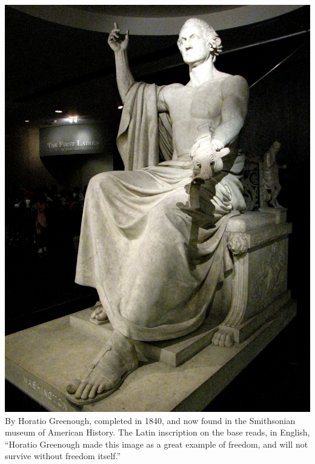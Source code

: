 \begin{frame}
    \centering
    \includegraphics[height=.8\textheight]{img/fasces/washington1.jpg} \\
    By Horatio Greenough, completed in 1840, and now found in the Smithsonian
    museum of American History. The Latin inscription on the base
    reads, in English, ``Horatio Greenough made this image as a great example
    of freedom, and will not survive without freedom itself.'' \\
\end{frame}

